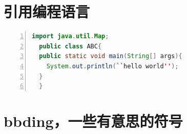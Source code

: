 \documentclass[a4paper,12pt]{article} %
\begin{document}
\section{引用编程语言}
\begin{lstlisting}[language=Java,firstline=2,lastline=5,numbers=left,numberstyle=\large,stepnumber=2,numbersep=10pt]
  import java.util.Map;
  public class ABC{
  public static void main(String[] args){
    System.out.println(``hello world'');
  }
  }
\end{lstlisting}
  
\section{bbding，一些有意思的符号}
\begin{Huge}
\HandRight \HandLeft \XSolid \Plus \Cross \CrossClowerTips \\
\CrossMaltese \FiveStar \FiveStarLines \SixStar \EightStar \TwelweStar \\
\SixteenStarLight \FiveFlowerOpen \FiveFlowerPetal \Snowflake \SnowflakeChevron \Sparkle \\
\SquareSolid \Square \TriangleUp \TriangleDown \OrnamentDiamondSolid \Ellipse \\
\Phone \Tape \Plane \Envelope \Peace \Checkmark \\
\end{Huge}
\end{document}

